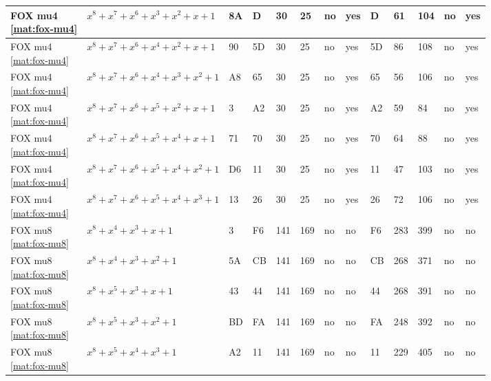 \begin{tiny}
\begin{longtable}{|l|l|l|l|l|l|l|l|l|l|l|l|l|}
\shortstack{FOX mu4 \\ \eqref{mat:fox-mu4}} & $x^8 + x^7 + x^6 + x^3 + x^2 + x + 1$ & 8A & D & 30 & 25 & no & yes & D & 61 & 104 & no & yes \\ \hline
\shortstack{FOX mu4 \\ \eqref{mat:fox-mu4}} & $x^8 + x^7 + x^6 + x^4 + x^2 + x + 1$ & 90 & 5D & 30 & 25 & no & yes & 5D & 86 & 108 & no & yes \\ \hline
\shortstack{FOX mu4 \\ \eqref{mat:fox-mu4}} & $x^8 + x^7 + x^6 + x^4 + x^3 + x^2 + 1$ & A8 & 65 & 30 & 25 & no & yes & 65 & 56 & 106 & no & yes \\ \hline
\shortstack{FOX mu4 \\ \eqref{mat:fox-mu4}} & $x^8 + x^7 + x^6 + x^5 + x^2 + x + 1$ & 3 & A2 & 30 & 25 & no & yes & A2 & 59 & 84 & no & yes \\ \hline
\shortstack{FOX mu4 \\ \eqref{mat:fox-mu4}} & $x^8 + x^7 + x^6 + x^5 + x^4 + x + 1$ & 71 & 70 & 30 & 25 & no & yes & 70 & 64 & 88 & no & yes \\ \hline
\shortstack{FOX mu4 \\ \eqref{mat:fox-mu4}} & $x^8 + x^7 + x^6 + x^5 + x^4 + x^2 + 1$ & D6 & 11 & 30 & 25 & no & yes & 11 & 47 & 103 & no & yes \\ \hline
\shortstack{FOX mu4 \\ \eqref{mat:fox-mu4}} & $x^8 + x^7 + x^6 + x^5 + x^4 + x^3 + 1$ & 13 & 26 & 30 & 25 & no & yes & 26 & 72 & 106 & no & yes \\ \hline
\shortstack{FOX mu8 \\ \eqref{mat:fox-mu8}} & $x^8 + x^4 + x^3 + x + 1$ & 3 & F6 & 141 & 169 & no & no & F6 & 283 & 399 & no & no \\ \hline
\shortstack{FOX mu8 \\ \eqref{mat:fox-mu8}} & $x^8 + x^4 + x^3 + x^2 + 1$ & 5A & CB & 141 & 169 & no & no & CB & 268 & 371 & no & no \\ \hline
\shortstack{FOX mu8 \\ \eqref{mat:fox-mu8}} & $x^8 + x^5 + x^3 + x + 1$ & 43 & 44 & 141 & 169 & no & no & 44 & 268 & 391 & no & no \\ \hline
\shortstack{FOX mu8 \\ \eqref{mat:fox-mu8}} & $x^8 + x^5 + x^3 + x^2 + 1$ & BD & FA & 141 & 169 & no & no & FA & 248 & 392 & no & no \\ \hline
\shortstack{FOX mu8 \\ \eqref{mat:fox-mu8}} & $x^8 + x^5 + x^4 + x^3 + 1$ & A2 & 11 & 141 & 169 & no & no & 11 & 229 & 405 & no & no \\ \hline

\end{longtable}
\end{tiny}
